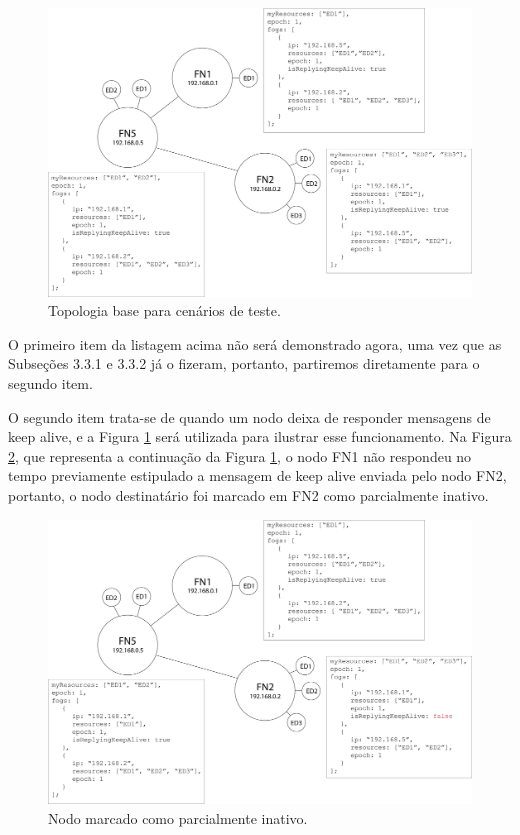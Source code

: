 \begin{figure}[H]
    \centering\includegraphics[width=.8\textwidth]{fig7.png}
    \caption[Topologia base para cenários de teste]
    {\label{fig:fig7} Topologia base para cenários de teste.}
\end{figure}

O primeiro item da listagem acima não será demonstrado agora, uma vez que as Subseções 3.3.1 e 3.3.2 já o fizeram, portanto, partiremos diretamente para o segundo item.

O segundo item trata-se de quando um nodo deixa de responder mensagens de keep alive, e a Figura \ref{fig:fig7} será utilizada para ilustrar esse funcionamento.
Na Figura \ref{fig:fig8}, que representa a continuação da Figura \ref{fig:fig7}, o nodo FN1 não respondeu no tempo previamente estipulado a mensagem de keep alive enviada pelo nodo FN2, 
portanto, o nodo destinatário foi marcado em FN2 como parcialmente inativo.


\begin{figure}[H]
    \centering\includegraphics[width=.8\textwidth]{fig8.png}
    \caption [Nodo marcado como parcialmente inativo]
    {\label{fig:fig8} Nodo marcado como parcialmente inativo.}
\end{figure}

